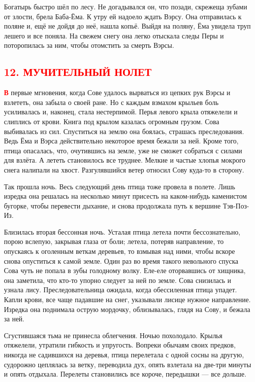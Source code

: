 \documentclass[oneside,final,14pt]{extreport}
\begin{document}
	Богатырь быстро шёл по лесу. Не догадывался он, что позади, скрежеща зубами от злости, брела Баба-Ёма. К утру ей надоело ждать Вэрсу. Она отправилась к поляне и, ещё не дойдя до неё, нашла копьё. Выйдя на поляну, Ёма увидела труп лешего и все поняла. На свежем снегу она легко отыскала следы Перы и поторопилась за ним, чтобы отомстить за смерть Вэрсы.
	
	
				{%
		\centering
		\subsection*{\textcolor{red}{12. МУЧИТЕЛЬНЫЙ НОЛЕТ}}
	}
	
	
	\lettrine[findent=0pt]{\textbf{\textcolor{red}{В}}}{} первые мгновения, когда Сове удалось вырваться из цепких рук Вэрсы и взлететь, она забыла о своей ране. Но с каждым взмахом крыльев боль усиливалась и, наконец, стала нестерпимой. Перья левого крыла отяжелели и слиплись от крови. Книга под крылом казалась огромным грузом. Сова выбивалась из сил. Спуститься на землю она боялась, страшась преследования. Ведь Ёма и Вэрса действительно некоторое время бежали за ней. Кроме того, птица опасалась, что, очутившись на земле, уже не сможет собраться с силами для взлёта. А лететь становилось все труднее. Мелкие и частые хлопья мокрого снега налипали на хвост. Разгулявшийся ветер относил Сову куда-то в сторону.
	
	Так прошла ночь. Весь следующий день птица тоже провела в полете. Лишь изредка она решалась на несколько минут присесть на каком-нибудь каменистом бугорке, чтобы перевести дыхание, и снова продолжала путь к вершине Тэв-Поз-Из.
	
	Близилась вторая бессонная ночь. Усталая птица летела почти бессознательно, порою вслепую, закрывая глаза от боли; летела, потеряв направление, то опускаясь к оголенным веткам деревьев, то взмывая над ними, чтобы вскоре снова опуститься к самой земле. Один раз во время такого невольного спуска Сова чуть не попала в зубы голодному волку. Еле-еле оторвавшись от хищника, она заметила, что кто-то упорно следует за ней по земле. Сова снизилась и узнала лису. Преследовательница ожидала, когда обессиленная птица упадет. Капли крови, все чаще падавшие на снег, указывали лисице нужное направление. Изредка она поднимала острую мордочку, облизывалась, глядя на Сову, и бежала за ней.
	
	Сгустившаяся тьма не принесла облегчения. Ночью похолодало. Крылья отяжелели, утратили гибкость и упругость. Вопреки обычаям своих предков, никогда не садившихся на деревья, птица перелетала с одной сосны на другую, судорожно цеплялась за ветку, переводила дух, опять взлетала на две-три минуты и опять отдыхала. Перелеты становились все короче, передышки — все дольше.
	
\end{document}
